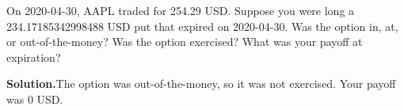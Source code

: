 \noindent On 2020-04-30, AAPL traded for 254.29 USD. Suppose you were long a 234.17185342998488 USD put that expired on 2020-04-30. Was the option in, at, or out-of-the-money? Was the option exercised? What was your payoff at expiration?

\vspace{9pt} 

\textbf{Solution.}The option was out-of-the-money, so it was not exercised. Your payoff was 0 USD.